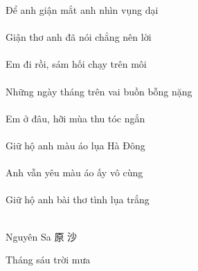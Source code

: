 \documentclass[14pt,a4paper]{extarticle}
\begin{document}
Để anh giận mắt anh nhìn vụng dại\\[1ex]
{\huge {}\ANH{}\ANH{}}\\[1ex]
Giận thơ anh đã nói chẳng nên lời\\[1ex]
{\huge {}\ANH{}}\\[1ex]
Em đi rồi, sám hối chạy trên môi\\[1ex]
{\huge \em{}}\\[1ex]\newpage 
Những ngày tháng trên vai buồn bỗng nặng\\[1ex]
{\huge {}\vai{}}\\[1ex]

Em ở đâu, hỡi mùa thu tóc ngắn\\[1ex]
{\huge \em\ở\thu{}}\\[1ex]
Giữ hộ anh màu áo lụa Hà Đông\\[1ex]
{\huge {}\ANH{}}\\[1ex]
Anh vẫn yêu màu áo ấy vô cùng\\[1ex]
{\huge \ANH{}}\\[1ex]
Giữ hộ anh bài thơ tình lụa trắng\\[1ex]
{\huge {}\ANH{}}\\[1ex]\bigskip

Nguyên Sa  {\huge 原  沙}

\newpage 



Tháng sáu trời mưa\\[1ex]
{\Huge{}}\\[3ex]
\end{document}
